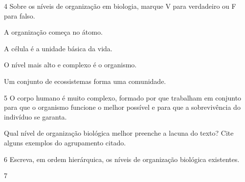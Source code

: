 \num{4}  Sobre os níveis de organização em biologia, marque V para verdadeiro ou F para falso.

\begin{boxlist}
\item A organização começa no átomo. 

\item A célula é a unidade básica da vida. 

\item O nível mais alto e complexo é o organismo. 

\item Um conjunto de ecossistemas forma uma comunidade. 
\end{boxlist}

\num{5}  O corpo humano é muito complexo, formado por \preencher 
  que trabalham em conjunto para que o organismo funcione o melhor possível e para que a sobrevivência do indivíduo se garanta.


Qual nível de organização biológica melhor preenche a lacuna do texto?
Cite alguns exemplos do agrupamento citado.


\num{6}  Escreva, em ordem hierárquica, os níveis de organização biológica existentes.



\num{7}

